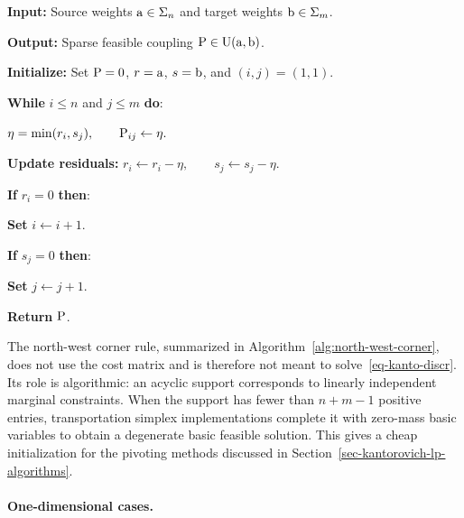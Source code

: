 \begin{alg}\label{alg:north-west-corner}
\textbf{Input:} Source weights $\a\in\simplex_n$ and target weights $\b\in\simplex_m$.

\textbf{Output:} Sparse feasible coupling $\P\in\CouplingsD(\a,\b)$.

\textbf{Initialize:} Set $\P=0$, $r=\a$, $s=\b$, and $(i,j)=(1,1)$.

\textbf{While} $i\leq n$ and $j\leq m$ \textbf{do}:
\begin{algblock}
\(\eta=\min(r_i,s_j), \qquad \P_{ij}\leftarrow \eta.\)

\textbf{Update residuals:}
\(r_i\leftarrow r_i-\eta, \qquad s_j\leftarrow s_j-\eta.\)

\textbf{If} $r_i=0$ \textbf{then}:
\begin{algblock}

\textbf{Set} $i\leftarrow i+1$.

\end{algblock}
\textbf{If} $s_j=0$ \textbf{then}:
\begin{algblock}

\textbf{Set} $j\leftarrow j+1$.

\end{algblock}
\end{algblock}
\algreturnskip
\textbf{Return} $\P$.
\end{alg}

The north-west corner rule, summarized in Algorithm~\ref{alg:north-west-corner}, does not use the cost matrix and is therefore not meant to solve~\eqref{eq-kanto-discr}. Its role is algorithmic: an acyclic support corresponds to linearly independent marginal constraints. When the support has fewer than $n+m-1$ positive entries, transportation simplex implementations complete it with zero-mass basic variables to obtain a degenerate basic feasible solution. This gives a cheap initialization for the pivoting methods discussed in Section~\ref{sec-kantorovich-lp-algorithms}.

\paragraph{One-dimensional cases.}

